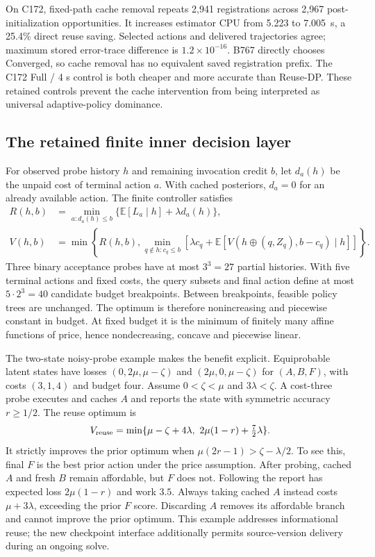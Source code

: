 On C172, fixed-path cache removal repeats 2,941 registrations across 2,967 post-initialization opportunities. It increases estimator CPU from 5.223 to 7.005~s, a 25.4\% direct reuse saving. Selected actions and delivered trajectories agree; maximum stored error-trace difference is $1.2\times10^{-16}$. B767 directly chooses Converged, so cache removal has no equivalent saved registration prefix. The C172 Full / 4 s control is both cheaper and more accurate than Reuse-DP. These retained controls prevent the cache intervention from being interpreted as universal adaptive-policy dominance.

\subsection{The retained finite inner decision layer}
For observed probe history $h$ and remaining invocation credit $b$, let $d_a(h)$ be the unpaid cost of terminal action $a$. With cached posteriors, $d_a=0$ for an already available action. The finite controller satisfies
\begin{align}
R(h,b)&=\min_{a:d_a(h)\le b}\{\mathbb E[L_a\mid h]+\lambda d_a(h)\},\\
V(h,b)&=\min\left\{R(h,b),\min_{q\notin h:c_q\le b}\left[\lambda c_q+\mathbb E[V(h\oplus(q,Z_q),b-c_q)\mid h]\right]\right\}.\label{eq:inner-bellman}
\end{align}
Three binary acceptance probes have at most $3^3=27$ partial histories. With five terminal actions and fixed costs, the query subsets and final action define at most $5\cdot2^3=40$ candidate budget breakpoints. Between breakpoints, feasible policy trees are unchanged. The optimum is therefore nonincreasing and piecewise constant in budget. At fixed budget it is the minimum of finitely many affine functions of price, hence nondecreasing, concave and piecewise linear.

The two-state noisy-probe example makes the benefit explicit. Equiprobable latent states have losses $(0,2\mu,\mu-\zeta)$ and $(2\mu,0,\mu-\zeta)$ for $(A,B,F)$, with costs $(3,1,4)$ and budget four. Assume $0<\zeta<\mu$ and $3\lambda<\zeta$. A cost-three probe executes and caches $A$ and reports the state with symmetric accuracy $r\ge1/2$. The reuse optimum is
\begin{equation}
V_{\rm reuse}=\min\{\mu-\zeta+4\lambda,\ 2\mu(1-r)+\tfrac72\lambda\}.\label{eq:retained-noisy}
\end{equation}
It strictly improves the prior optimum when $\mu(2r-1)>\zeta-\lambda/2$. To see this, final $F$ is the best prior action under the price assumption. After probing, cached $A$ and fresh $B$ remain affordable, but $F$ does not. Following the report has expected loss $2\mu(1-r)$ and work $3.5$. Always taking cached $A$ instead costs $\mu+3\lambda$, exceeding the prior $F$ score. Discarding $A$ removes its affordable branch and cannot improve the prior optimum. This example addresses informational reuse; the new checkpoint interface additionally permits source-version delivery during an ongoing solve.

